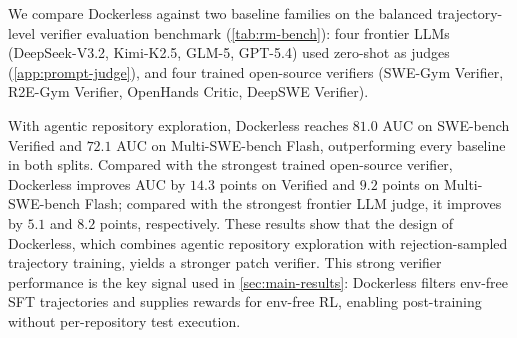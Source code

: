 \documentclass{llmxive}
\providecommand{\approach}{Dockerless\xspace}
\begin{document}
We compare \approach against two baseline families on the balanced trajectory-level verifier evaluation benchmark (\cref{tab:rm-bench}): four frontier LLMs (DeepSeek-V3.2, Kimi-K2.5, GLM-5, GPT-5.4) used zero-shot as judges (\cref{app:prompt-judge}), and four trained open-source verifiers (SWE-Gym Verifier, R2E-Gym Verifier, OpenHands Critic, DeepSWE Verifier).

With agentic repository exploration, \approach reaches $81.0$ AUC on SWE-bench Verified and $72.1$ AUC on Multi-SWE-bench Flash, outperforming every baseline in both splits.
Compared with the strongest trained open-source verifier, \approach improves AUC by $14.3$ points on Verified and $9.2$ points on Multi-SWE-bench Flash; compared with the strongest frontier LLM judge, it improves by $5.1$ and $8.2$ points, respectively.
These results show that the design of \approach, which combines agentic repository exploration with rejection-sampled trajectory training, yields a stronger patch verifier.
This strong verifier performance is the key signal used in \cref{sec:main-results}: \approach filters env-free SFT trajectories and supplies rewards for env-free RL, enabling post-training without per-repository test execution.



\end{document}

